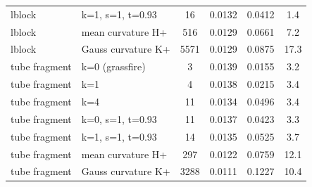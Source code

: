 \begin{tabular}{llcccc}
lblock & k=1, s=1, t=0.93 & 16 & 0.0132 & 0.0412 & 1.4 \\
lblock & mean curvature H+ & 516 & 0.0129 & 0.0661 & 7.2 \\
lblock & Gauss curvature K+ & 5571 & 0.0129 & 0.0875 & 17.3 \\
\midrule
tube fragment & k=0 (grassfire) & 3 & 0.0139 & 0.0155 & 3.2 \\
tube fragment & k=1 & 4 & 0.0138 & 0.0215 & 3.4 \\
tube fragment & k=4 & 11 & 0.0134 & 0.0496 & 3.4 \\
tube fragment & k=0, s=1, t=0.93 & 11 & 0.0137 & 0.0423 & 3.3 \\
tube fragment & k=1, s=1, t=0.93 & 14 & 0.0135 & 0.0525 & 3.7 \\
tube fragment & mean curvature H+ & 297 & 0.0122 & 0.0759 & 12.1 \\
tube fragment & Gauss curvature K+ & 3288 & 0.0111 & 0.1227 & 10.4 \\
\bottomrule
\end{tabular}
